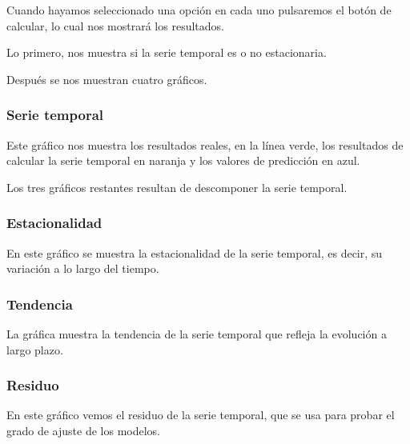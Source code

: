 
Cuando hayamos seleccionado una opción en cada uno pulsaremos el botón de calcular, lo cual nos mostrará los resultados.

Lo primero, nos muestra si la serie temporal es o no estacionaria.


Después se nos muestran cuatro gráficos.

\subsubsection{Serie temporal}
Este gráfico nos muestra los resultados reales, en la línea verde, los resultados de calcular la serie temporal en naranja y los valores de predicción en azul.


Los tres gráficos restantes resultan de descomponer la serie temporal.

\subsubsection{Estacionalidad}
En este gráfico se muestra la estacionalidad de la serie temporal, es decir, su variación a lo largo del tiempo.


\subsubsection{Tendencia}
La gráfica muestra la tendencia de la serie temporal que refleja la evolución a largo plazo.


\subsubsection{Residuo}
En este gráfico vemos el residuo de la serie temporal, que se usa para probar el grado de ajuste de los modelos.



